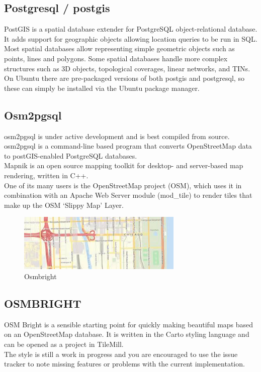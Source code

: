 \subsection{Postgresql / postgis}
PostGIS is a spatial database extender for PostgreSQL object-relational database. It adds support for geographic objects allowing location queries to be run in SQL.\\
Most spatial databases allow representing simple geometric objects such as points, lines and polygons. Some spatial databases handle more complex structures such as 3D objects, topological coverages, linear networks, and TINs.\\
On Ubuntu there are pre-packaged versions of both postgis and postgresql, so these can simply be installed via the Ubuntu package manager.\\
\subsection{Osm2pgsql}
 osm2pgsql is under active development and is best compiled from source.\\
osm2pgsql is a command-line based program that converts OpenStreetMap data to postGIS-enabled PostgreSQL databases.\\
Mapnik is an open source mapping toolkit for desktop- and server-based map rendering, written in C++.\\
One of its many users is the OpenStreetMap project (OSM), which uses it in combination with an Apache Web Server module (mod\_tile) to render tiles that make up the OSM ‘Slippy Map’ Layer.\\
\begin{figure}[!ht]
\centering
\includegraphics[width=0.7\textwidth]{input/images/bright.jpeg}                   
\caption{Osmbright}
\hspace{-1.5em}
\end{figure}



\subsection{OSMBRIGHT}
OSM Bright is a sensible starting point for quickly making beautiful maps based on an OpenStreetMap database. It is written in the Carto styling language and can be opened as a project in TileMill.\\
The style is still a work in progress and you are encouraged to use the issue tracker to note missing features or problems with the current implementation.\\
